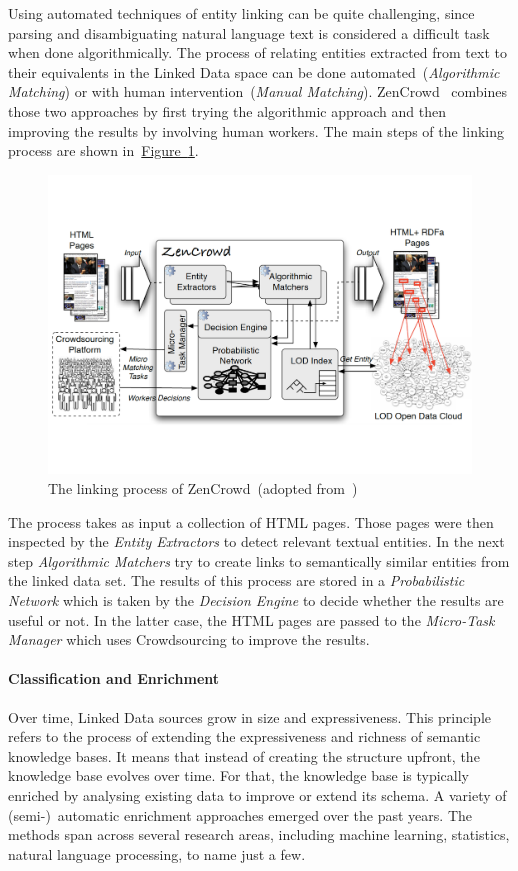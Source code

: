 Using automated techniques of entity linking can be quite challenging, since parsing and disambiguating natural language
text is considered a difficult task when done algorithmically. The process of relating entities extracted from text to their equivalents in the Linked Data space can be done automated~(\emph{Algorithmic Matching}) or with human intervention~(\emph{Manual Matching}). ZenCrowd~\cite{demartini2012} combines those two approaches by first trying the algorithmic approach and then improving the results by involving human workers. The main steps of the linking process are shown in~\hyperref[fig:zencrowd]{Figure~\ref*{fig:zencrowd}}.
\begin{figure}
	 \centering
	 \includegraphics[width=\textwidth]{graphics/zencrowd}
	 \caption{The linking process of ZenCrowd~(adopted from~\cite{demartini2012})}
	 \label{fig:zencrowd}
\end{figure}
The process takes as input a collection of HTML pages. Those pages were then inspected by the \emph{Entity Extractors} to detect relevant textual entities. In the next step \emph{Algorithmic Matchers} try to create links to semantically similar entities from the linked data set. The results of this process are stored in a \emph{Probabilistic Network} which is taken by the \emph{Decision Engine} to decide whether the results are useful or not. In the latter case, the HTML pages are passed to the \emph{Micro-Task Manager} which uses Crowdsourcing to improve the results. 


\paragraph{Classification and Enrichment}
Over time, Linked Data sources grow in size and expressiveness. This principle refers to the process of extending the expressiveness and richness 
of semantic knowledge bases. It means that instead of creating the structure upfront, the knowledge base evolves over time. For that, the knowledge 
base is typically enriched by analysing existing data to improve or extend its schema. A variety of (semi-)~automatic enrichment approaches emerged over the past years. The methods span across several research areas, including machine learning, statistics, natural language processing, to name just a few. 


